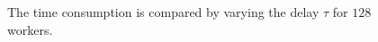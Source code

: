 \documentclass[10pt,journal,finalsubmission,compsoc]{IEEEtran}
\begin{document}
\begin{figure}
\centering
{}
\caption{The time consumption is compared by varying the delay $\tau$ for $128$ workers.}
\label{figure_evaluation3_delay}
\end{figure}
\end{document}
